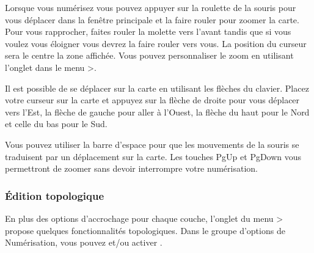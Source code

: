 \begin{itemize}
Lorsque vous numérisez vous pouvez appuyer sur la roulette de la souris pour vous déplacer dans la fenêtre principale et la faire rouler pour zoomer la carte. Pour vous rapprocher, faites rouler la molette vers l'avant tandis que si vous voulez vous éloigner vous devrez la faire rouler vers vous. La position du curseur sera le centre la zone affichée. Vous pouvez personnaliser le zoom en utilisant l'onglet  dans le menu  >.



Il est possible de se déplacer sur la carte en utilisant les flèches du clavier. Placez votre curseur sur la carte et appuyez sur la flèche de droite pour vous déplacer vers l'Est, la flèche de gauche pour aller à l'Ouest, la flèche du haut pour le Nord et celle du bas pour le Sud.


Vous pouvez utiliser la barre d'espace pour que les mouvements de la souris se traduisent par un déplacement sur la carte. Les touches PgUp et PgDown vous permettront de zoomer sans devoir interrompre votre numérisation.

\subsubsection{Édition topologique}

En plus des options d'accrochage pour chaque couche, l'onglet  du menu  >  propose quelques fonctionnalités topologiques. Dans le groupe d'options de Numérisation, vous pouvez  et/ou activer .


\end{itemize}
